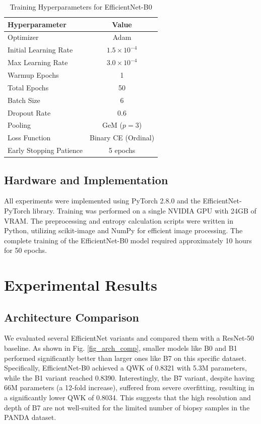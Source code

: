 \documentclass[10pt,conference]{IEEEtran}
\begin{document}
\begin{table}[!h]
\renewcommand{\arraystretch}{1.3}
\caption{Training Hyperparameters for EfficientNet-B0}
\label{table_hyperparams}
\centering
\begin{tabular}{lc}
\hline
\textbf{Hyperparameter} & \textbf{Value} \\
\hline
Optimizer & Adam \\
Initial Learning Rate & $1.5 \times 10^{-4}$ \\
Max Learning Rate & $3.0 \times 10^{-4}$ \\
Warmup Epochs & 1 \\
Total Epochs & 50 \\
Batch Size & 6 \\
Dropout Rate & 0.6 \\
Pooling & GeM ($p=3$) \\
Loss Function & Binary CE (Ordinal) \\
Early Stopping Patience & 5 epochs \\
\hline
\end{tabular}
\end{table}

\subsection{Hardware and Implementation}
All experiments were implemented using PyTorch 2.8.0 and the EfficientNet-PyTorch library. Training was performed on a single NVIDIA GPU with 24GB of VRAM. The preprocessing and entropy calculation scripts were written in Python, utilizing scikit-image and NumPy for efficient image processing. The complete training of the EfficientNet-B0 model required approximately 10 hours for 50 epochs.

\section{Experimental Results}
\subsection{Architecture Comparison}
We evaluated several EfficientNet variants and compared them with a ResNet-50 baseline. As shown in Fig. \ref{fig_arch_comp}, smaller models like B0 and B1 performed significantly better than larger ones like B7 on this specific dataset. Specifically, EfficientNet-B0 achieved a QWK of 0.8321 with 5.3M parameters, while the B1 variant reached 0.8390. Interestingly, the B7 variant, despite having 66M parameters (a 12-fold increase), suffered from severe overfitting, resulting in a significantly lower QWK of 0.8034. This suggests that the high resolution and depth of B7 are not well-suited for the limited number of biopsy samples in the PANDA dataset.
\end{document}
